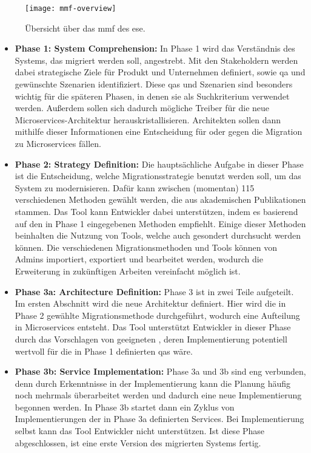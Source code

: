 \begin{figure}
	\centering
	\texttt{[image: mmf-overview]}
	\caption[Übersicht über \acrshort{mmf}]{
		Übersicht über das \gls{mmf} des \gls{ese}.
	}
	\label{fig:expert-material-mmf-overview}
\end{figure}

\begin{itemize}
	\item \textbf{Phase 1: System Comprehension:}
	In Phase 1 wird das Verständnis des Systems, das migriert werden soll, angestrebt.
	Mit den Stakeholdern werden dabei strategische Ziele für Produkt und Unternehmen definiert, sowie \acrfull{qa} und gewünschte Szenarien identifiziert.
	Diese \glspl{qa} und Szenarien sind besonders wichtig für die späteren Phasen, in denen sie als Suchkriterium verwendet werden.
	Außerdem sollen sich dadurch mögliche Treiber für die neue Microservices-Architektur herauskristallisieren.
	Architekten sollen dann mithilfe dieser Informationen eine Entscheidung für oder gegen die Migration zu Microservices fällen.
	\item \textbf{Phase 2: Strategy Definition:}
	Die hauptsächliche Aufgabe in dieser Phase ist die Entscheidung, welche Migrationsstrategie benutzt werden soll, um das System zu modernisieren.
	Dafür kann zwischen (momentan) 115 verschiedenen Methoden gewählt werden, die aus akademischen Publikationen stammen.
	Das Tool kann Entwickler dabei unterstützen, indem es basierend auf den in Phase 1 eingegebenen  Methoden empfiehlt.
	Einige dieser Methoden beinhalten die Nutzung von Tools, welche auch gesondert durchsucht werden können.
	Die verschiedenen Migrationsmethoden und Tools können von Admins importiert, exportiert und bearbeitet werden, wodurch die Erweiterung in zukünftigen Arbeiten vereinfacht möglich ist.
	\item \textbf{Phase 3a: Architecture Definition:}
	Phase 3 ist in zwei Teile aufgeteilt.
	Im ersten Abschnitt wird die neue Architektur definiert.
	Hier wird die in Phase 2 gewählte Migrationsmethode durchgeführt, wodurch eine Aufteilung in Microservices entsteht.
	Das Tool unterstützt Entwickler in dieser Phase durch das Vorschlagen von geeigneten \bpp, deren Implementierung potentiell wertvoll für die in Phase 1 definierten \glspl{qa} wäre.
	\item \textbf{Phase 3b: Service Implementation:}
	Phase 3a und 3b sind eng verbunden, denn durch Erkenntnisse in der Implementierung kann die Planung häufig noch mehrmals überarbeitet werden und dadurch eine neue Implementierung begonnen werden.
	In Phase 3b startet dann ein Zyklus von Im\-ple\-men\-tie\-rung\-en der in Phase 3a definierten Services.
	Bei Implementierung selbst kann das Tool Entwickler nicht unterstützen.
	Ist diese Phase abgeschlossen, ist eine erste Version des migrierten Systems fertig.
\end{itemize}

